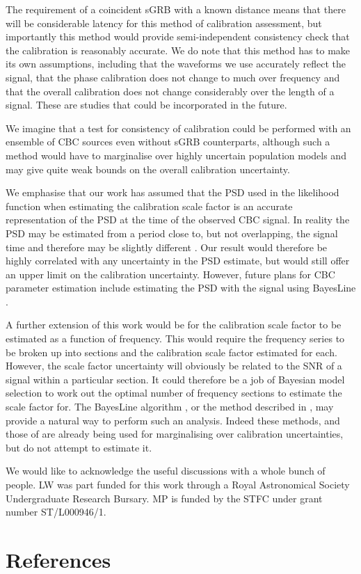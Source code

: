 \documentclass[10pt]{iopart}
\begin{document}
The requirement of a coincident \ac{sGRB} with a known distance means that there will be 
considerable latency for this method of calibration assessment, but importantly this method would 
provide semi-independent consistency check that the calibration is reasonably accurate. We do note 
that this method has to make its own assumptions, including that the waveforms we use accurately 
reflect the signal, that the phase calibration does not change to much over frequency and that 
the overall calibration does not change considerably over the length of a signal. These are studies 
that could be incorporated in the future.

We imagine that a test for consistency of calibration could be performed with an ensemble of 
\ac{CBC} sources even without \ac{sGRB} counterparts, although such a method would have to 
marginalise over highly uncertain population models and may give quite weak bounds on the overall 
calibration uncertainty.

We emphasise that our work has assumed that the \ac{PSD} used in the likelihood function when 
estimating the calibration scale factor is an accurate representation of the \ac{PSD} at the time 
of the observed \ac{CBC} signal. In reality the \ac{PSD} may be estimated from a period close to, 
but not overlapping, the signal time and therefore may be slightly different 
\cite{2013PhRvD..88h4044L}. Our result would therefore be highly correlated with any 
uncertainty in the \ac{PSD} estimate, but would still offer an upper limit on the calibration 
uncertainty. However, future plans for \ac{CBC} parameter estimation include estimating the 
\ac{PSD} with the signal using BayesLine \cite{2015PhRvD..91h4034L}.

A further extension of this work would be for the calibration scale factor to be estimated as a 
function of frequency. This would require the frequency series to be broken up into sections and 
the calibration scale factor estimated for each. However, the scale factor uncertainty will 
obviously be related to the \ac{SNR} of a signal within a particular section. It could 
therefore be a job of Bayesian model selection to work out the optimal number of frequency 
sections to estimate the scale factor for. The BayesLine algorithm \cite{2015PhRvD..91h4034L}, or 
the method described in \cite{2013PhRvD..88h4044L}, may provide a natural way to perform such an
analysis. Indeed these methods, and those of \cite{Vitale:2012} are already being used for 
marginalising over calibration uncertainties, but do not attempt to estimate it.

\ack

We would like to acknowledge the useful discussions with a whole bunch of people. LW was part 
funded for this work through a Royal Astronomical Society Undergraduate Research Bursary.
MP is funded by the STFC under grant number ST/L000946/1.

\section*{References}



\end{document}
